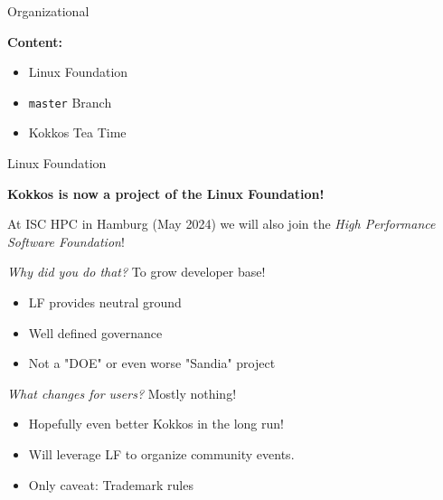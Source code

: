

\begin{frame}[fragile]

  {\Huge Organizational}

  \vspace{10pt}

  \textbf{Content:}
  \begin{itemize}
    \item Linux Foundation
    \item{\texttt{master} Branch}
    \item Kokkos Tea Time
  \end{itemize}

\end{frame}


\begin{frame}[fragile]{Linux Foundation}
\begin{center}
\textbf{Kokkos is now a project of the Linux Foundation!}
\end{center}

At ISC HPC in Hamburg (May 2024) we will also join the \textit{High Performance Software Foundation}!


\textit{Why did you do that?} To grow developer base!
\begin{itemize}
\item{LF provides neutral ground}
\item{Well defined governance}
\item{Not a "DOE" or even worse "Sandia" project}
\end{itemize}

\textit{What changes for users?} Mostly nothing!
\begin{itemize}
\item{Hopefully even better Kokkos in the long run!}
\item{Will leverage LF to organize community events.}
\item{Only caveat: Trademark rules}
\end{itemize}
\end{frame}

